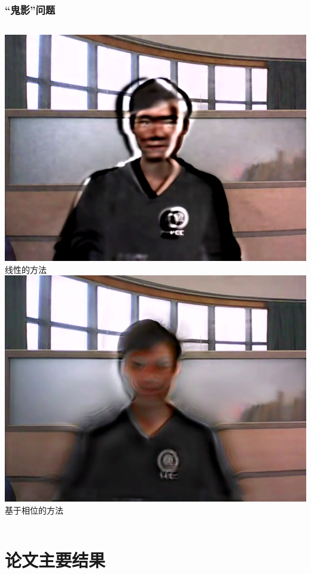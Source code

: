 \documentclass[xcolor=svgnames,serif,table,10pt]{beamer}
\begin{document}
\begin{frame}
  \frametitle{“鬼影”问题}

  \begin{columns}
    \Large
    \centering
    \includegraphics[width=.9\textwidth]{ghost-linear.png}\\
    线性的方法
    \centering
    \includegraphics[width=.9\textwidth]{ghost-phase.png}\\
    基于相位的方法
  \end{columns}

  \begin{center}
  \end{center}
\end{frame}

\section{论文主要结果}
\end{document}

